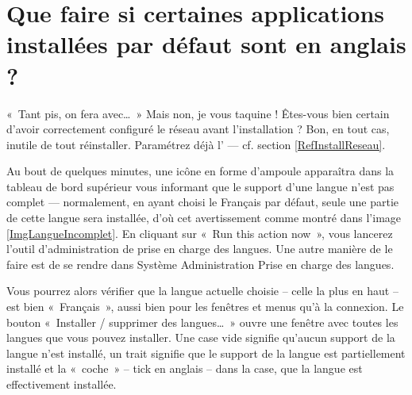 \section{Que faire si certaines applications installées par défaut sont en anglais ?}
\label{RefSupportLangue}
«~Tant pis, on fera avec\ldots{}~»
Mais non, je vous taquine ! Êtes-vous bien certain d'avoir correctement configuré le réseau avant l'installation ? Bon, en tout cas, inutile de tout réinstaller. Paramétrez déjà l' --- cf. section \ref{RefInstallReseau}.\par
Au bout de quelques minutes, une icône en forme d'ampoule apparaîtra dans la tableau de bord supérieur vous informant que le support d'une langue n'est pas complet --- normalement, en ayant choisi le Français par défaut, seule une partie de cette langue sera installée, d'où cet avertissement comme montré dans l'image \ref{ImgLangueIncomplet}. En cliquant sur «~Run this action now~», vous lancerez l'outil d'administration de prise en charge des langues. Une autre manière de le faire est de se rendre dans Système \FlecheDroite Administration \FlecheDroite Prise en charge des langues.\par
{}
Vous pourrez alors vérifier que la langue actuelle choisie -- celle la plus en haut -- est bien «~Français~», aussi bien pour les fenêtres et menus qu'à la connexion. Le bouton «~Installer / supprimer des langues\ldots{}~» ouvre une fenêtre avec toutes les langues que vous pouvez installer. Une case vide signifie qu'aucun support de la langue n'est installé, un trait signifie que le support de la langue est partiellement installé et la «~coche~» -- tick en anglais -- dans la case, que la langue est effectivement installée.\par

